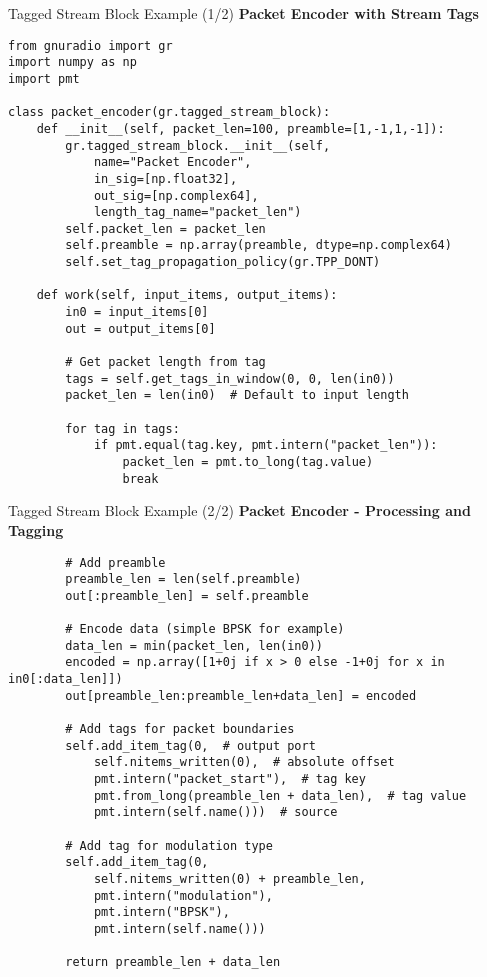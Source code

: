 \documentclass[aspectratio=169,11pt]{beamer}
\begin{document}
\begin{frame}[fragile]{Tagged Stream Block Example (1/2)}
\textbf{Packet Encoder with Stream Tags}
\tiny
\begin{verbatim}
from gnuradio import gr
import numpy as np
import pmt

class packet_encoder(gr.tagged_stream_block):
    def __init__(self, packet_len=100, preamble=[1,-1,1,-1]):
        gr.tagged_stream_block.__init__(self,
            name="Packet Encoder",
            in_sig=[np.float32],
            out_sig=[np.complex64],
            length_tag_name="packet_len")
        self.packet_len = packet_len
        self.preamble = np.array(preamble, dtype=np.complex64)
        self.set_tag_propagation_policy(gr.TPP_DONT)
        
    def work(self, input_items, output_items):
        in0 = input_items[0]
        out = output_items[0]
        
        # Get packet length from tag
        tags = self.get_tags_in_window(0, 0, len(in0))
        packet_len = len(in0)  # Default to input length
        
        for tag in tags:
            if pmt.equal(tag.key, pmt.intern("packet_len")):
                packet_len = pmt.to_long(tag.value)
                break
\end{verbatim}
\end{frame}

\begin{frame}[fragile]{Tagged Stream Block Example (2/2)}
\textbf{Packet Encoder - Processing and Tagging}
\tiny
\begin{verbatim}
        # Add preamble
        preamble_len = len(self.preamble)
        out[:preamble_len] = self.preamble
        
        # Encode data (simple BPSK for example)
        data_len = min(packet_len, len(in0))
        encoded = np.array([1+0j if x > 0 else -1+0j for x in in0[:data_len]])
        out[preamble_len:preamble_len+data_len] = encoded
        
        # Add tags for packet boundaries
        self.add_item_tag(0,  # output port
            self.nitems_written(0),  # absolute offset
            pmt.intern("packet_start"),  # tag key
            pmt.from_long(preamble_len + data_len),  # tag value
            pmt.intern(self.name()))  # source
            
        # Add tag for modulation type
        self.add_item_tag(0,
            self.nitems_written(0) + preamble_len,
            pmt.intern("modulation"),
            pmt.intern("BPSK"),
            pmt.intern(self.name()))
        
        return preamble_len + data_len
\end{verbatim}
\end{frame}
\end{document}
